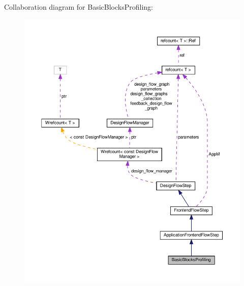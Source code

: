 Collaboration diagram for Basic\+Blocks\+Profiling\+:
\nopagebreak
\begin{figure}[H]
\begin{center}
\leavevmode
\includegraphics[width=350pt]{d8/de7/classBasicBlocksProfiling__coll__graph}
\end{center}
\end{figure}
